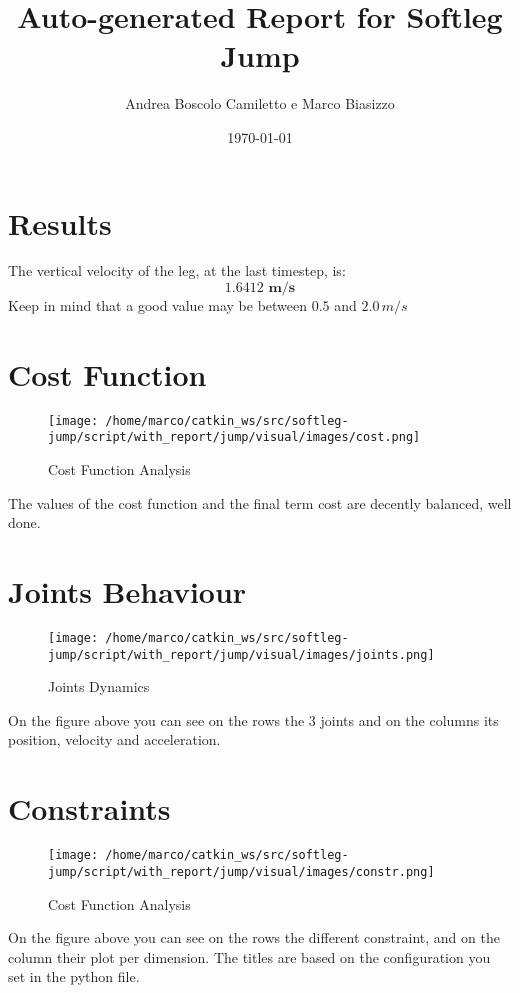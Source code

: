 \documentclass{article}%
\title{Auto{-}generated Report for Softleg Jump}%
\author{Andrea Boscolo Camiletto e Marco Biasizzo}%
\date{\today}%
\begin{document}
%
\normalsize%
\maketitle%
\section{Results}%
\label{sec:Results}%
The vertical velocity of the leg, at the last timestep, is:%
\[%
\boldsymbol{1.6412\,\, m/s}%
\]%
Keep in mind that a good value may be between $0.5$ and $2.0 \, m/s$

%
\section{Cost Function}%
\label{sec:CostFunction}%


\begin{figure}[h!]%
\centering%
\texttt{[image: /home/marco/catkin\_ws/src/softleg-jump/script/with\_report/jump/visual/images/cost.png]}%
\caption{Cost Function Analysis}%
\end{figure}

%
%
The values of the cost function and the final term cost are decently balanced, well done.

%
\pagebreak%
\section{Joints Behaviour}%
\label{sec:JointsBehaviour}%


\begin{figure}[h!]%
\centering%
\texttt{[image: /home/marco/catkin\_ws/src/softleg-jump/script/with\_report/jump/visual/images/joints.png]}%
\caption{Joints Dynamics}%
\end{figure}

%
On the figure above you can see on the rows the 3 joints and on the columns its position, velocity and acceleration.

%
\pagebreak%
\section{Constraints}%
\label{sec:Constraints}%


\begin{figure}[h!]%
\centering%
\texttt{[image: /home/marco/catkin\_ws/src/softleg-jump/script/with\_report/jump/visual/images/constr.png]}%
\caption{Cost Function Analysis}%
\end{figure}

%
On the figure above you can see on the rows the different constraint, and on the column their plot per dimension. The titles are based on the configuration you set in the python file.

%
\end{document}

